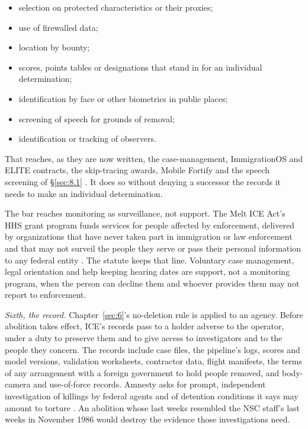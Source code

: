 \begin{itemize}
\item selection on protected characteristics or their proxies;
\item use of firewalled data;
\item location by bounty;
\item scores, points tables or designations that stand in for an individual determination;
\item identification by face or other biometrics in public places;
\item screening of speech for grounds of removal;
\item identification or tracking of observers.
\end{itemize}

That reaches, as they are now written, the case-management, ImmigrationOS and ELITE contracts, the skip-tracing awards, Mobile Fortify and the speech screening of \S\ref{sec:8.1} \autocite{Koebler2025ICM,Ho2025ImmigrationOS,Cox2026ELITE,Biddle2025BountyHunters,Cox2025MobileFortify,Caputo2025CatchRevoke}. It does so without denying a successor the records it needs to make an individual determination.

The bar reaches monitoring as surveillance, not support. The Melt ICE Act's HHS grant program funds services for people affected by enforcement, delivered by organizations that have never taken part in immigration or law enforcement and that may not surveil the people they serve or pass their personal information to any federal entity \autocite{hr7190}. The statute keeps that line. Voluntary case management, legal orientation and help keeping hearing dates are support, not a monitoring program, when the person can decline them and whoever provides them may not report to enforcement.

\emph{Sixth, the record.} Chapter~\ref{sec:6}'s no-deletion rule is applied to an agency. Before abolition takes effect, ICE's records pass to a holder adverse to the operator, under a duty to preserve them and to give access to investigators and to the people they concern. The records include case files, the pipeline's logs, scores and model versions, validation worksheets, contractor data, flight manifests, the terms of any arrangement with a foreign government to hold people removed, and body-camera and use-of-force records. Amnesty asks for prompt, independent investigation of killings by federal agents and of detention conditions it says may amount to torture \autocite{Amnesty2026Whistles}. An abolition whose last weeks resembled the NSC staff's last weeks in November 1986 would destroy the evidence those investigations need.

